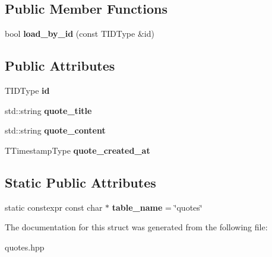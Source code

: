\subsection*{Public Member Functions}
\begin{DoxyCompactItemize}
\item 
\mbox{\label{structmods_1_1orm_1_1base__quotes_a1e3f59a7b0d3e7fc6b0dccc8884dec27}} 
bool {\bfseries load\+\_\+by\+\_\+id} (const T\+I\+D\+Type \&id)
\end{DoxyCompactItemize}
\subsection*{Public Attributes}
\begin{DoxyCompactItemize}
\item 
\mbox{\label{structmods_1_1orm_1_1base__quotes_a9a2df0edb32ee82916989c4e879835c9}} 
T\+I\+D\+Type {\bfseries id}
\item 
\mbox{\label{structmods_1_1orm_1_1base__quotes_a70586f9180a43d8ebd1a61395422ae3e}} 
std\+::string {\bfseries quote\+\_\+title}
\item 
\mbox{\label{structmods_1_1orm_1_1base__quotes_ab994c968a56e1fe996b01d82c989fb34}} 
std\+::string {\bfseries quote\+\_\+content}
\item 
\mbox{\label{structmods_1_1orm_1_1base__quotes_a567a5349410ed1266e3c4657002d454a}} 
T\+Timestamp\+Type {\bfseries quote\+\_\+created\+\_\+at}
\end{DoxyCompactItemize}
\subsection*{Static Public Attributes}
\begin{DoxyCompactItemize}
\item 
\mbox{\label{structmods_1_1orm_1_1base__quotes_a21c31ffaa906ff2fd8788cd9f7a3ea7a}} 
static constexpr const char $\ast$ {\bfseries table\+\_\+name} = \char`\"{}quotes\char`\"{}
\end{DoxyCompactItemize}


The documentation for this struct was generated from the following file\+:\begin{DoxyCompactItemize}
\item 
quotes.\+hpp\end{DoxyCompactItemize}
